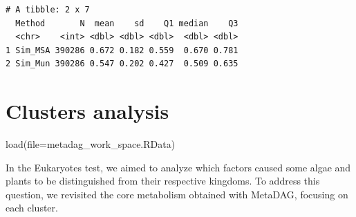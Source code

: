 \documentclass[
  letterpaper,
  DIV=11,
  numbers=noendperiod]{scrreprt}
\newenvironment{Shaded}{}{}
\newcommand{\AttributeTok}[1]{\textcolor[rgb]{0.78,0.47,0.87}{#1}}
\newcommand{\CommentTok}[1]{\textcolor[rgb]{0.36,0.39,0.44}{\textit{#1}}}
\newcommand{\ConstantTok}[1]{\textcolor[rgb]{0.82,0.60,0.40}{#1}}
\newcommand{\FunctionTok}[1]{\textcolor[rgb]{0.38,0.69,0.94}{#1}}
\newcommand{\NormalTok}[1]{\textcolor[rgb]{0.67,0.70,0.75}{#1}}
\newcommand{\OtherTok}[1]{\textcolor[rgb]{0.15,0.68,0.38}{#1}}
\newcommand{\SpecialCharTok}[1]{\textcolor[rgb]{0.34,0.71,0.76}{#1}}
\newcommand{\StringTok}[1]{\textcolor[rgb]{0.60,0.76,0.47}{#1}}
\begin{document}
\begin{verbatim}
# A tibble: 2 x 7
  Method       N  mean    sd    Q1 median    Q3
  <chr>    <int> <dbl> <dbl> <dbl>  <dbl> <dbl>
1 Sim_MSA 390286 0.672 0.182 0.559  0.670 0.781
2 Sim_Mun 390286 0.547 0.202 0.427  0.509 0.635
\end{verbatim}


\chapter{Clusters analysis}\label{clusters-analysis}

\begin{Shaded}
\begin{Highlighting}[]
\FunctionTok{load}\NormalTok{(}\AttributeTok{file=}\StringTok{\textquotesingle{}metadag\_work\_space.RData\textquotesingle{}}\NormalTok{)}
\end{Highlighting}
\end{Shaded}

In the Eukaryotes test, we aimed to analyze which factors caused some
algae and plants to be distinguished from their respective kingdoms. To
address this question, we revisited the core metabolism obtained with
MetaDAG, focusing on each cluster.

\begin{Shaded}
\end{Shaded}
\end{document}
